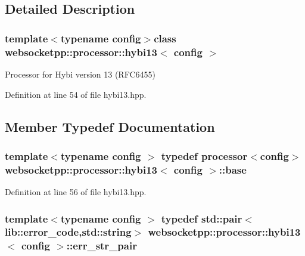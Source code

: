\subsection{Detailed Description}
\subsubsection*{template$<$typename config$>$class websocketpp\+::processor\+::hybi13$<$ config $>$}

Processor for Hybi version 13 (R\+F\+C6455) 

Definition at line 54 of file hybi13.\+hpp.



\subsection{Member Typedef Documentation}
\hypertarget{classwebsocketpp_1_1processor_1_1hybi13_a8153dff44df2368d14f2ecd8473ea064}{}
\subsubsection[{base}]{\setlength{\rightskip}{0pt plus 5cm}template$<$typename config $>$ typedef {\bf processor}$<$config$>$ {\bf websocketpp\+::processor\+::hybi13}$<$ config $>$\+::{\bf base}}\label{classwebsocketpp_1_1processor_1_1hybi13_a8153dff44df2368d14f2ecd8473ea064}


Definition at line 56 of file hybi13.\+hpp.

\hypertarget{classwebsocketpp_1_1processor_1_1hybi13_a1ebac644e40640950b65782ccc39a33a}{}
\subsubsection[{err\+\_\+str\+\_\+pair}]{\setlength{\rightskip}{0pt plus 5cm}template$<$typename config $>$ typedef std\+::pair$<$lib\+::error\+\_\+code,std\+::string$>$ {\bf websocketpp\+::processor\+::hybi13}$<$ config $>$\+::{\bf err\+\_\+str\+\_\+pair}}\label{classwebsocketpp_1_1processor_1_1hybi13_a1ebac644e40640950b65782ccc39a33a}


